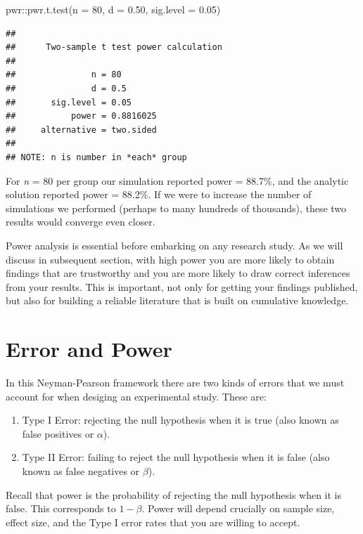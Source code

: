 \documentclass[
]{book}
\newenvironment{Shaded}{\begin{snugshade}}{\end{snugshade}}
\newcommand{\AttributeTok}[1]{\textcolor[rgb]{0.77,0.63,0.00}{#1}}
\newcommand{\DecValTok}[1]{\textcolor[rgb]{0.00,0.00,0.81}{#1}}
\newcommand{\FloatTok}[1]{\textcolor[rgb]{0.00,0.00,0.81}{#1}}
\newcommand{\FunctionTok}[1]{\textcolor[rgb]{0.00,0.00,0.00}{#1}}
\newcommand{\NormalTok}[1]{#1}
\newcommand{\SpecialCharTok}[1]{\textcolor[rgb]{0.00,0.00,0.00}{#1}}
\begin{document}
\begin{Shaded}
\begin{Highlighting}[]
\NormalTok{pwr}\SpecialCharTok{::}\FunctionTok{pwr.t.test}\NormalTok{(}\AttributeTok{n =} \DecValTok{80}\NormalTok{, }\AttributeTok{d =} \FloatTok{0.50}\NormalTok{, }\AttributeTok{sig.level =} \FloatTok{0.05}\NormalTok{)}
\end{Highlighting}
\end{Shaded}

\begin{verbatim}
## 
##      Two-sample t test power calculation 
## 
##               n = 80
##               d = 0.5
##       sig.level = 0.05
##           power = 0.8816025
##     alternative = two.sided
## 
## NOTE: n is number in *each* group
\end{verbatim}

For \emph{n} = 80 per group our simulation reported power = 88.7\%, and the analytic solution reported power = 88.2\%. If we were to increase the number of simulations we performed (perhaps to many hundreds of thousands), these two results would converge even closer.

Power analysis is essential before embarking on any research study. As we will discuss in subsequent section, with high power you are more likely to obtain findings that are trustworthy and you are more likely to draw correct inferences from your results. This is important, not only for getting your findings published, but also for building a reliable literature that is built on cumulative knowledge.

\hypertarget{error-and-power}{%
\section{Error and Power}\label{error-and-power}}

In this Neyman-Pearson framework there are two kinds of errors that we must account for when desiging an experimental study. These are:

\begin{enumerate}
\def\labelenumi{\arabic{enumi}.}
\item
  Type I Error: rejecting the null hypothesis when it is true (also known as false positives or \(\alpha\)).
\item
  Type II Error: failing to reject the null hypothesis when it is false (also known as false negatives or \(\beta\)).
\end{enumerate}

Recall that power is the probability of rejecting the null hypothesis when it is false. This corresponds to \(1-\beta\). Power will depend crucially on sample size, effect size, and the Type I error rates that you are willing to accept.
\end{document}

